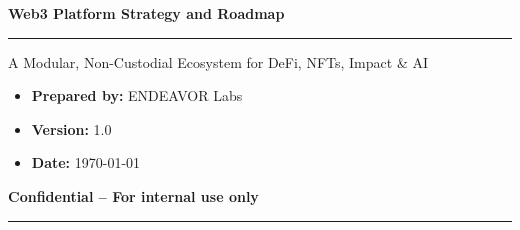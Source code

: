 \documentclass[13pt]{extarticle}
\begin{document}
\begin{titlepage}
  \centering
  \vspace*{2cm}
  {\Huge\bfseries Web3 Platform Strategy and Roadmap\par}
  \vspace{0.5cm}
  {\rule{\textwidth}{1.5pt}\par}
  \vspace{0.5cm}
  {\Large\sffamily A Modular, Non-Custodial Ecosystem for DeFi, NFTs, Impact \& AI\par}
  \vspace{1.7cm}
  \vspace{2cm}
  \begin{flushleft}
    \large
    \begin{itemize}[leftmargin=1.5em,label={}]
      \item \textbf{Prepared by:} ENDEAVOR Labs
      \item \textbf{Version:} 1.0
      \item \textbf{Date:} \today
    \end{itemize}
  \end{flushleft}
  \vfill
  \vspace{-1cm} %
  {\centering\small\textbf{Confidential – For internal use only}\par}
  \vspace{0.3cm}
  {\centering\color{black} \rule{0.5\textwidth}{0.6pt}\par}
\end{titlepage}
\end{document}
